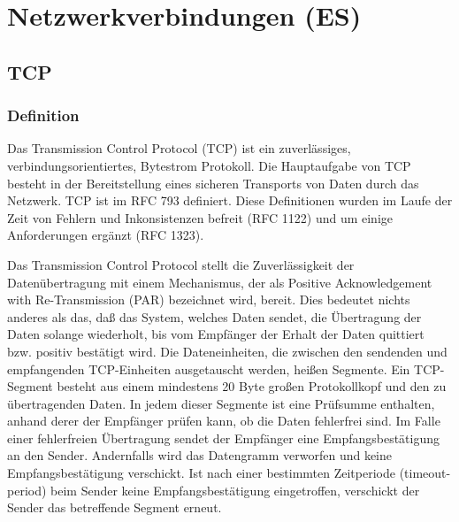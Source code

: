 \newcommand\tab[1][1cm]{\hspace*{#1}}
\section{Netzwerkverbindungen (ES)}
\subsection{TCP}
\subsubsection{Definition}
Das Transmission Control Protocol (TCP) ist ein zuverlässiges, verbindungsorientiertes, Bytestrom Protokoll. Die Hauptaufgabe von TCP besteht in der Bereitstellung eines sicheren Transports von Daten durch das Netzwerk. TCP ist im RFC 793 definiert. Diese Definitionen wurden im Laufe der Zeit von Fehlern und Inkonsistenzen befreit (RFC 1122) und um einige Anforderungen ergänzt (RFC 1323).

Das Transmission Control Protocol stellt die Zuverlässigkeit der Datenübertragung mit einem Mechanismus, der als Positive Acknowledgement with Re-Transmission (PAR) bezeichnet wird, bereit. Dies bedeutet nichts anderes als das, daß das System, welches Daten sendet, die Übertragung der Daten solange wiederholt, bis vom Empfänger der Erhalt der Daten quittiert bzw. positiv bestätigt wird. Die Dateneinheiten, die zwischen den sendenden und empfangenden TCP-Einheiten ausgetauscht werden, heißen Segmente. Ein TCP-Segment besteht aus einem mindestens 20 Byte großen Protokollkopf und den zu übertragenden Daten. In jedem dieser Segmente ist eine Prüfsumme enthalten, anhand derer der Empfänger prüfen kann, ob die Daten fehlerfrei sind. Im Falle einer fehlerfreien Übertragung sendet der Empfänger eine Empfangsbestätigung an den Sender. Andernfalls wird das Datengramm verworfen und keine Empfangsbestätigung verschickt. Ist nach einer bestimmten Zeitperiode (timeout-period) beim Sender keine Empfangsbestätigung eingetroffen, verschickt der Sender das betreffende Segment erneut. 

